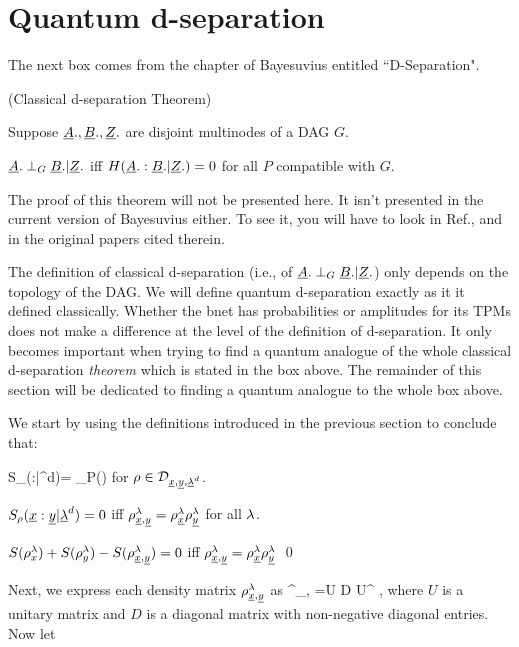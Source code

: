 \documentclass[12pt]{article}
\begin{document}
\section{Quantum d-separation}

The next box comes
from the chapter of Bayesuvius
entitled ``D-Separation".

\begin{framed}
\begin{claim}(Classical d-separation Theorem)

Suppose
${\underline{A}}., {\underline{B}}., {\underline{Z}}.$
are disjoint multinodes
of a DAG  $G$.

${\underline{A}}.\perp_G {\underline{B}}.|{\underline{Z}}.$ iff
$H({\underline{A}}. : {\underline{B}}.|{\underline{Z}}.)=0$
for all $P$
compatible with $G$.

\end{claim}
\end{framed}
The proof
of this theorem
will
not be presented
here. It isn't
presented in the 
current version of Bayesuvius either.
To see it, 
you will
have to look
in Ref.\cite{pearl-1988book},
and in the original 
papers cited therein.

The definition
of classical d-separation 
(i.e., of ${\underline{A}}.\perp_G {\underline{B}}.|{\underline{Z}}.$)
only depends on the topology
of the DAG. We will
define quantum d-separation
exactly as it
it
defined classically.
Whether the bnet has 
probabilities
or amplitudes
for its TPMs
does not make a difference
at the 
level
of the definition
of d-separation.
It only becomes
important
when trying
to
find a quantum
analogue of the 
whole classical
d-separation {\it theorem}
which is stated in the box above.
The remainder
of this section
will
be dedicated to finding 
a quantum
analogue
to the whole box above.

We start by
using
the definitions
introduced
in the previous section
to conclude that:

\beq
S_\rho(\rvx:\rvy|\rvlam^d)=
\sum_\lam P(\lam) 
\eeq
for $\rho\in {\cal D}_{{\underline{x}},{\underline{y}}, {\underline{\lambda}}^d}$.

\begin{claim}
$S_\rho({\underline{x}}:{\underline{y}}|{\underline{\lambda}}^d)=0$
iff $\rho^\lambda_{{\underline{x}}, {\underline{y}}}=
\rho^\lambda_{{\underline{x}}}
\rho^\lambda_{{\underline{y}}}$
for all $\lambda$.
\end{claim}
\proof

$S(\rho^\lambda_x)+S(\rho^\lambda_y)-
S(\rho^\lambda_{{\underline{x}},{\underline{y}}})=0$
iff
$\rho^\lambda_{{\underline{x}}, {\underline{y}}}=
\rho^\lambda_{{\underline{x}}}
\rho^\lambda_{{\underline{y}}}$
\qed

Next, we express 
each density matrix
$\rho^\lambda_{{\underline{x}}, {\underline{y}}}$ as
\beq
\rho^\lam_{\rvx, \rvy}
=U D U^\dag
\;,
\eeq
where $U$
is a unitary
matrix
and $D$
is a diagonal matrix
with non-negative diagonal entries.
Now let
\end{document}
